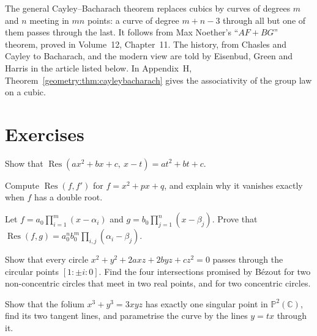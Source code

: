 \begin{remark}
The general Cayley--Bacharach theorem replaces cubics by curves of degrees $m$ and $n$ meeting in $mn$ points: a curve of degree $m+n-3$ through all but one of
them passes through the last. It follows from Max Noether's ``$AF+BG$'' theorem, proved in Volume~12, Chapter~11. The history, from Chasles and Cayley to
Bacharach, and the modern view are told by Eisenbud, Green and Harris in the article listed below. In Appendix~H, Theorem~\ref{geometry:thm:cayleybacharach} gives the
associativity of the group law on a cubic.
\end{remark}

\section{Exercises}

\begin{exercise}[$\star$]\label{geometry:ex:reslinear}
Show that $\operatorname{Res}(ax^2+bx+c,\ x-t)=at^2+bt+c$.
\end{exercise}

\begin{exercise}[$\star$]\label{geometry:ex:discriminant}
Compute $\operatorname{Res}(f,f')$ for $f=x^2+px+q$, and explain why it vanishes exactly when $f$ has a double root.
\end{exercise}

\begin{exercise}[$\star\star$]\label{geometry:ex:resproduct}
Let $f=a_0\prod_{i=1}^m(x-\alpha_i)$ and $g=b_0\prod_{j=1}^n(x-\beta_j)$. Prove that $\operatorname{Res}(f,g)=a_0^nb_0^m\prod_{i,j}(\alpha_i-\beta_j)$.
\end{exercise}

\begin{exercise}[$\star\star$]\label{geometry:ex:circularpoints}
Show that every circle $x^2+y^2+2axz+2byz+cz^2=0$ passes through the circular points $[1:\pm i:0]$. Find the four intersections promised by B\'ezout
for two non-concentric circles that meet in two real points, and for two concentric circles.
\end{exercise}

\begin{exercise}[$\star$]\label{geometry:ex:folium}
Show that the folium $x^3+y^3=3xyz$ has exactly one singular point in $\mathbb P^2(\mathbb C)$, find its two tangent lines, and parametrise the
curve by the lines $y=tx$ through it.
\end{exercise}


